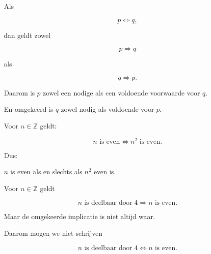 \documentclass{ximera}
\begin{document}

Als

\[
p\Leftrightarrow q,
\]

dan geldt zowel

\[
p\Rightarrow q
\]

als

\[
q\Rightarrow p.
\]

Daarom is $p$ zowel een nodige als een voldoende voorwaarde voor $q$.

En omgekeerd is $q$ zowel nodig als voldoende voor $p$.


\begin{voorbeeld}

Voor $n\in\mathbb{Z}$ geldt:

\[
n\text{ is even}
\Leftrightarrow
n^2\text{ is even}.
\]

Dus:

\begin{center}
$n$ is even als en slechts als $n^2$ even is.
\end{center}

\end{voorbeeld}


\begin{voorbeeld}

Voor $n\in\mathbb{Z}$ geldt

\[
n\text{ is deelbaar door }4
\Rightarrow
n\text{ is even}.
\]

Maar de omgekeerde implicatie is niet altijd waar.

Daarom mogen we niet schrijven

\[
n\text{ is deelbaar door }4
\Leftrightarrow
n\text{ is even}.
\]

\end{voorbeeld}
\end{document}
